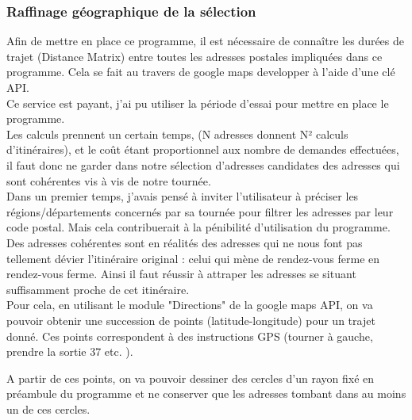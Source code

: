 \documentclass[12pt]{article}
\begin{document}
\subsubsection{Raffinage géographique de la sélection}
Afin de mettre en place ce programme, il est nécessaire de connaître les durées de trajet (Distance Matrix) entre toutes les adresses postales impliquées dans ce programme. Cela se fait au travers de google maps developper à l'aide d'une clé API.\\

Ce service est payant, j'ai pu utiliser la période d'essai pour mettre en place le programme.\\
Les calculs prennent un certain temps, (N adresses donnent N² calculs d'itinéraires), et le coût étant proportionnel aux nombre de demandes effectuées, il faut donc ne garder dans notre sélection d'adresses candidates des adresses qui sont cohérentes vis à vis de notre tournée.\\

Dans un premier temps, j'avais pensé à inviter l'utilisateur à préciser les régions/départements concernés par sa tournée pour filtrer les adresses par leur code postal. Mais cela contribuerait à la pénibilité d'utilisation du programme.\\

Des adresses cohérentes sont en réalités des adresses qui ne nous font pas tellement dévier l'itinéraire original : celui qui mène de rendez-vous ferme en rendez-vous ferme. Ainsi il faut réussir à attraper les adresses se situant suffisamment proche de cet itinéraire.\\

Pour cela, en utilisant le module "Directions" de la google maps API, on va pouvoir obtenir une succession de points (latitude-longitude) pour un trajet donné. Ces points correspondent à des instructions GPS (tourner à gauche, prendre la sortie 37 etc. ).

A partir de ces points, on va pouvoir dessiner des cercles d'un rayon fixé en préambule du programme et ne conserver que les adresses tombant dans au moins un de ces cercles.
\end{document}
